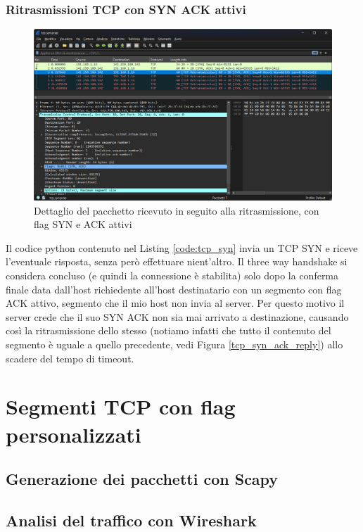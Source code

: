 \documentclass[12pt,a4paper]{report}
\begin{document}
\subsection{Ritrasmissioni TCP con SYN ACK attivi}
\begin{figure}[H]
	\centering
	\includegraphics[width=1\textwidth]{tcp_syn_ack_retransmission}
 	\caption{Dettaglio del pacchetto ricevuto in seguito alla ritrasmissione, con flag SYN e ACK attivi}
	\label{tcp_syn_ack_retransmission}
\end{figure}
Il codice python contenuto nel Listing \ref{code:tcp_syn} invia un TCP SYN e riceve l'eventuale risposta, senza però effettuare nient'altro.
Il three way handshake si considera concluso (e quindi la connessione è stabilita) solo dopo la conferma finale data dall'host richiedente all'host destinatario con un segmento con flag ACK attivo, segmento che il mio host non invia al server.
Per questo motivo il server crede che il suo SYN ACK non sia mai arrivato a destinazione, causando così la ritrasmissione dello stesso (notiamo infatti che tutto il contenuto del segmento è uguale a quello precedente, vedi Figura \ref{tcp_syn_ack_reply}) allo scadere del tempo di timeout.

\chapter{Segmenti TCP con flag personalizzati}

\section{Generazione dei pacchetti con Scapy}
\section{Analisi del traffico con Wireshark}
\end{document}

